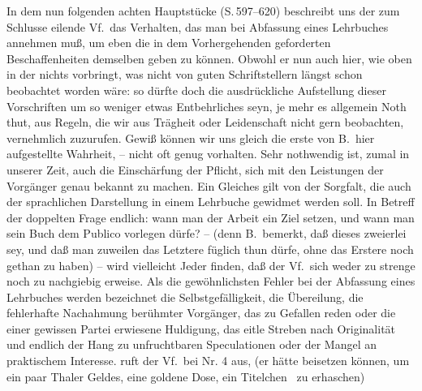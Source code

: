 In dem nun folgenden achten Hauptstücke (S.\,597--620) beschreibt uns der zum Schlusse eilende Vf.\ das Verhalten, das man bei Abfassung eines Lehrbuches annehmen muß, um eben die in dem Vorhergehenden geforderten Beschaffenheiten demselben geben zu können. Obwohl er nun auch hier, wie oben in der  nichts vorbringt, was nicht von guten Schriftstellern längst schon beobachtet worden wäre: so dürfte doch die ausdrückliche Aufstellung dieser Vorschriften um so weniger etwas Entbehrliches seyn, je mehr es allgemein Noth thut, aus Regeln, die wir aus Trägheit oder Leidenschaft nicht gern beobachten, vernehmlich zuzurufen. Gewiß können wir uns gleich die erste von B.\ hier aufgestellte Wahrheit,  -- nicht oft genug vorhalten. Sehr nothwendig ist, zumal in unserer Zeit, auch die Einschärfung der Pflicht, sich mit den Leistungen der Vorgänger genau bekannt zu machen. Ein Gleiches gilt von der Sorgfalt, die auch der sprachlichen Darstellung in einem Lehrbuche gewidmet werden soll. In Betreff der doppelten Frage endlich: wann man der Arbeit ein Ziel setzen, und wann man sein Buch dem Publico vorlegen dürfe? -- (denn B.\ bemerkt, daß dieses zweierlei sey,  und daß man zuweilen das Letztere füglich thun dürfe, ohne das Erstere noch gethan zu haben) -- wird vielleicht Jeder finden, daß der Vf.\ sich weder zu strenge noch zu nachgiebig erweise. Als die gewöhnlichsten Fehler bei der Abfassung eines Lehrbuches werden  bezeichnet die Selbstgefälligkeit, die Übereilung, die fehlerhafte Nachahmung berühmter Vorgänger, das zu Gefallen reden oder die einer gewissen Partei erwiesene Huldigung, das eitle Streben nach Originalität und endlich der Hang zu unfruchtbaren Speculationen oder der Mangel an praktischem Interesse.  ruft der Vf.\ bei Nr. 4 aus,  (er hätte beisetzen können, um ein paar Thaler Geldes, eine goldene Dose, ein Titelchen \udgl\ zu erhaschen)  \par 

